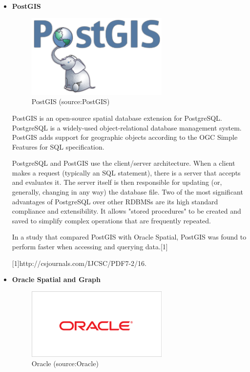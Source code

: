 \begin{itemize}
\item \textbf{PostGIS}

\begin{figure}[H] \centering
      \includegraphics[width=200pt]{./pictures/postgis.png}
      \caption[PostGIS logo]{PostGIS (source:PostGIS)}
      \label{fig:PostGIS}
  \end{figure}
  
PostGIS is an open-source spatial database extension for PostgreSQL. PostgreSQL is a widely-used object-relational database management system. PostGIS adds support for geographic objects according to the OGC Simple Features for SQL specification. 

PostgreSQL and PostGIS use the client/server architecture. When a client makes a request (typically an SQL statement), there is a server that accepts and evaluates it. The server itself is then responsible for updating (or, generally, changing in any way) the database file. Two of the most significant advantages of PostgreSQL over other RDBMSs are its high standard compliance and extensibility. It allows "stored procedures" to be created and saved to simplify complex operations that are frequently repeated. 

In a study that compared PostGIS with Oracle Spatial, PostGIS  was found to perform faster when accessing and querying data.[1]



[1]http://csjournals.com/IJCSC/PDF7-2/16.%
	
\item \textbf{Oracle Spatial and Graph}


\begin{figure}[H] \centering
      \includegraphics[width=200pt]{./pictures/oracle.png}
      \caption[Oracle logo]{Oracle (source:Oracle)}
      \label{fig:Oracle}
  \end{figure}
  

\end{itemize}
